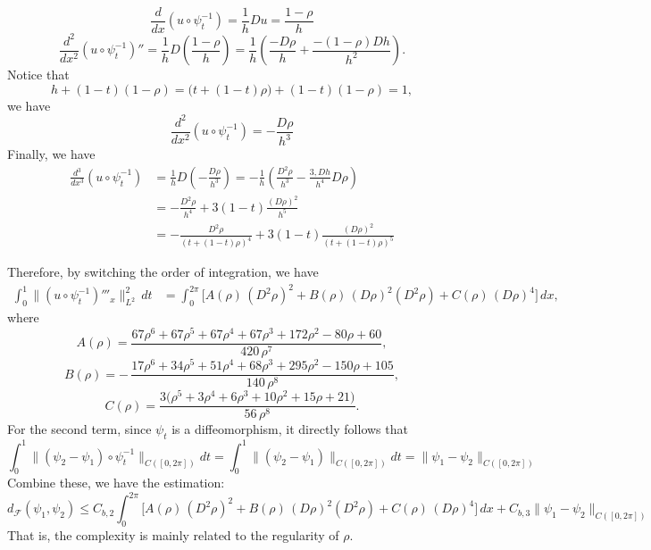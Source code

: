 \documentclass[12pt]{amsart}
\numberwithin{equation}{section}
\theoremstyle{remark}
\begin{document}
\begin{equation}
    \frac{d}{dx}(u\circ\psi_t^{-1}) =\frac{1}{h} Du = \frac{1-\rho}{h}
\end{equation}
\begin{equation}
    \frac{d^2}{dx^2}(u\circ\psi_t^{-1})''=\frac{1}{h}D\left(\frac{1-\rho}{h}\right)
=\frac{1}{h}\left(\frac{-D\rho}{h}+\frac{-(1-\rho)Dh}{h^2}\right).
\end{equation}
Notice that
\begin{equation}
    h+(1-t)(1-\rho)=\big(t+(1-t)\rho\big)+(1-t)(1-\rho)=1,
\end{equation}
we have
\begin{equation}
    \frac{d^2}{dx^2}(u\circ\psi_t^{-1})=-\frac{D\rho}{h^3}
\end{equation}
Finally, we have
\begin{equation}
    \begin{aligned}
\frac{d^3}{dx^3}(u\circ\psi_t^{-1})&=\frac{1}{h}D\left(-\frac{D\rho}{h^3}\right)
=-\frac{1}{h}\left(\frac{D^2\rho}{h^3}-\frac{3,Dh}{h^4}D\rho\right)\\
&= -\frac{D^2\rho}{h^4}+3(1-t)\frac{(D\rho)^2}{h^5}\\
& = -\frac{D^2\rho}{(t+(1-t)\rho)^4}+3(1-t)\frac{(D\rho)^2}{(t+(1-t)\rho)^5}
    \end{aligned}
\end{equation}

Therefore, by switching the order of integration, we have
\begin{align}
\int_0^1 \big\|(u\circ\psi_t^{-1})'''_x\big\|_{L^2}^2\,dt
&= \int_0^{2\pi} \!\Big[A(\rho)\,(D^2\rho)^2 + B(\rho)\,(D\rho)^2(D^2\rho)
+ C(\rho)\,(D\rho)^4\Big]\,dx, \label{eq:third}
\end{align}
where
\[
A(\rho)=\frac{67\rho^6+67\rho^5+67\rho^4+67\rho^3+172\rho^2-80\rho+60}{420\,\rho^7},
\]
\[
B(\rho)=-\,\frac{17\rho^6+34\rho^5+51\rho^4+68\rho^3+295\rho^2-150\rho+105}{140\,\rho^8},
\]
\[
C(\rho)=\frac{3\big(\rho^5+3\rho^4+6\rho^3+10\rho^2+15\rho+21\big)}{56\,\rho^8}.
\]
For the second term, since $\psi_t$ is a diffeomorphism, it directly follows that
\begin{equation}
    \int_0^1 \|(\psi_2-\psi_1)\circ \psi_t^{-1}\|_{C([0,2\pi])}dt = \int_0^1 \|(\psi_2-\psi_1)\|_{C([0,2\pi])}dt = \|\psi_1-\psi_2\|_{C([0,2\pi])}
\end{equation}
Combine these, we have the estimation:
\begin{equation}
    d_{\mathcal F}(\psi_1, \psi_2) \le C_{b,2}\int_0^{2\pi} \!\Big[A(\rho)\,(D^2\rho)^2 + B(\rho)\,(D\rho)^2(D^2\rho)
+ C(\rho)\,(D\rho)^4\Big]\,dx + C_{b,3} \|\psi_1-\psi_2\|_{C([0,2\pi])}
\end{equation}
That is, the complexity is mainly related to the regularity of $\rho$.
\end{document}
